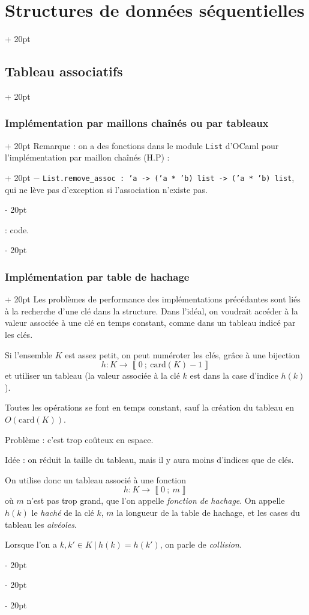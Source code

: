 \documentclass[a4paper, 12pt, twoside]{article}
\newcommand{\nset}[2]{\left\llbracket #1\ ;\ #2 \right\rrbracket}
\newcommand{\ind}[1][20pt]{\advance\leftskip + #1}
\newcommand{\deind}[1][20pt]{\advance\leftskip - #1}
\newenvironment{indt}[2][20pt]{#2 \par \ind[#1]}{\par \deind} %
\begin{document}
\begin{indt}{\section{Structures de données séquentielles}}
\begin{indt}{\subsection{Tableau associatifs}}
\begin{indt}{\subsubsection{Implémentation par maillons chaînés ou par tableaux}}
\begin{indt}{Remarque : on a des fonctions dans le module \texttt{List} d'OCaml pour l'implémentation par maillon chaînés (H.P) :}
                    $-$ \texttt{List.remove\_assoc : 'a -> ('a * 'b) list -> ('a * 'b) list}, qui ne lève pas d'exception si l'association n'existe pas.
                \end{indt}
                
                \vspace{6pt}
                
                 : code.
            \end{indt}
            
            \vspace{6pt}
            
            \begin{indt}{\subsubsection{Implémentation par table de hachage}}
                Les problèmes de performance des implémentations précédantes sont liés à la recherche d'une clé dans la structure. Dans l'idéal, on voudrait accéder à la valeur associée à une clé en temps constant, comme dans un tableau indicé par les clés.
                
                Si l'ensemble $K$ est assez petit, on peut numéroter les clés, grâce à une bijection
                    \[h : K \longrightarrow \nset{0}{\mathrm{card}(K) - 1}\]
                et utiliser un tableau (la valeur associée à la clé $k$ est dans la case d'indice $h(k)$).
                
                Toutes les opérations se font en temps constant, sauf la création du tableau en $O(\mathrm{card}(K))$.
                
                Problème : c'est trop coûteux en espace.
                
                Idée : on réduit la taille du tableau, mais il y aura moins d'indices que de clés.
                
                On utilise donc un tableau associé à une fonction
                    \[ h : K \longrightarrow \nset{0}{m} \]
                où $m$ n'est pas trop grand, que l'on appelle \textit{fonction de hachage}. On appelle $h(k)$ le \textit{haché} de la clé $k$, $m$ la longueur de la table de hachage, et les cases du tableau les \textit{alvéoles}.
                
                Lorsque l'on a $k, k' \in K\ |\ h(k) = h(k')$, on parle de \textit{collision}.
                

\end{indt}
\end{indt}
\end{indt}
\end{document}
